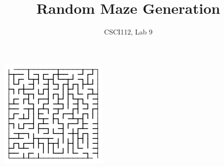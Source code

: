 \documentclass{article}
\title{Random Maze Generation}
\author{CSCI112, Lab 9}
\begin{document}
\maketitle




\centerline{\includegraphics[scale=0.5]{maze.png}}
\end{document}
